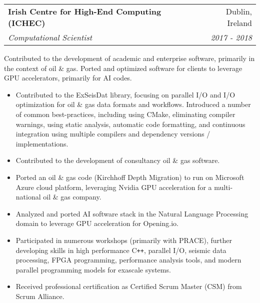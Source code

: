 \documentclass[11pt]{article}
\makeatletter
\newenvironment{resumeSubSectionHeader}{
    \par
    \begin{tabular*}{\textwidth}{l@{\extracolsep{\fill}}r}
    \par
} {
    \end{tabular*}
    \par
}
\newenvironment{resumeSubSectionBody}{
    \par
    \vspace{-0.2\parskip}
    \begin{small}
    \par
} {
    \par
    \end{small}
    \par
}
\newenvironment{resumeItemize}{
    \vspace{-0.5\baselineskip}
    \begin{itemize}
} {
    \end{itemize}
}
\makeatother
\begin{document}
\begin{resumeSubSectionHeader}

    \textbf{Irish Centre for High-End Computing (ICHEC)} & Dublin, Ireland \\
    \emph{Computational Scientist}                 & \emph{2017 - 2018}

\end{resumeSubSectionHeader}
\begin{resumeSubSectionBody}

    Contributed to the development of academic and enterprise software,
    primarily in the context of oil \& gas.
    Ported and optimized software for clients to leverage GPU accelerators,
    primarily for AI codes.

    \begin{resumeItemize}
        \item
            Contributed to the ExSeisDat library, focusing on parallel I/O
            and I/O optimization for oil \& gas data formats and workflows.
            Introduced a number of common best-practices, including using CMake,
            eliminating compiler warnings, using static analysis, automatic code
            formatting, and continuous integration using multiple compilers and
            dependency versions / implementations.

        \item
            Contributed to the development of consultancy oil \& gas software.

        \item
            Ported an oil \& gas code (Kirchhoff Depth Migration) to run on
            Microsoft Azure cloud platform, leveraging Nvidia GPU acceleration
            for a multi-national oil \& gas company.

        \item
            Analyzed and ported AI software stack in the Natural Language
            Processing domain to leverage GPU acceleration for Opening.io.

        \item
            Participated in numerous workshops (primarily with PRACE), further
            developing skills in high performance C\verb!++!, parallel I/O,
            seismic data processing, FPGA programming, performance analysis
            tools, and modern parallel programming models for exascale systems.

        \item
            Received professional certification as Certified Scrum Master (CSM)
            from Scrum Alliance.
    \end{resumeItemize}

\end{resumeSubSectionBody}
\end{document}
